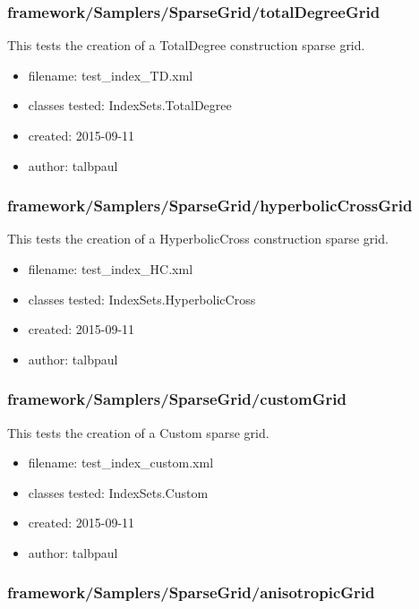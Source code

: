    \subsubsection{framework/Samplers/SparseGrid/totalDegreeGrid}
      
      This tests the creation of a TotalDegree construction sparse grid.
    
      \begin{itemize}
          \item filename: test\_index\_TD.xml
          \item classes tested: IndexSets.TotalDegree
          \item created: 2015-09-11
          \item author: talbpaul
      \end{itemize}
    \subsubsection{framework/Samplers/SparseGrid/hyperbolicCrossGrid}
      
      This tests the creation of a HyperbolicCross construction sparse grid.
    
      \begin{itemize}
          \item filename: test\_index\_HC.xml
          \item classes tested: IndexSets.HyperbolicCross
          \item created: 2015-09-11
          \item author: talbpaul
      \end{itemize}
    \subsubsection{framework/Samplers/SparseGrid/customGrid}
      
      This tests the creation of a Custom sparse grid.
    
      \begin{itemize}
          \item filename: test\_index\_custom.xml
          \item classes tested: IndexSets.Custom
          \item created: 2015-09-11
          \item author: talbpaul
      \end{itemize}
    \subsubsection{framework/Samplers/SparseGrid/anisotropicGrid}
      
